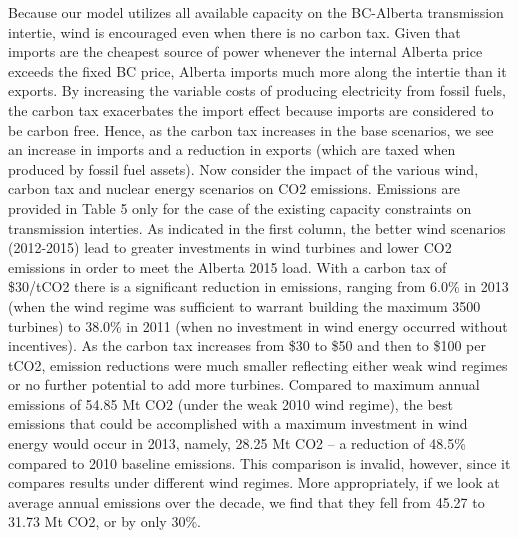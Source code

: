 \begin{table}[]
\end{table}




Because our model utilizes all available capacity on the BC-Alberta transmission intertie, wind is encouraged even when there is no carbon tax. Given that imports are the cheapest source of power whenever the internal Alberta price exceeds the fixed BC price, Alberta imports much more along the intertie than it exports. By increasing the variable costs of producing electricity from fossil fuels, the carbon tax exacerbates the import effect because imports are considered to be carbon free. Hence, as the carbon tax increases in the base scenarios, we see an increase in imports and a reduction in exports (which are taxed when produced by fossil fuel assets).
Now consider the impact of the various wind, carbon tax and nuclear energy scenarios on CO2 emissions. Emissions are provided in Table 5 only for the case of the existing capacity constraints on transmission interties. As indicated in the first column, the better wind scenarios (2012-2015) lead to greater investments in wind turbines and lower CO2 emissions in order to meet the Alberta 2015 load. With a carbon tax of \$30/tCO2 there is a significant reduction in emissions, ranging from 6.0\% in 2013 (when the wind regime was sufficient to warrant building the maximum 3500 turbines) to 38.0\% in 2011 (when no investment in wind energy occurred without incentives). As the carbon tax increases from \$30 to \$50 and then to \$100 per tCO2, emission reductions were much smaller reflecting either weak wind regimes or no further potential to add more turbines. Compared to maximum annual emissions of 54.85 Mt CO2 (under the weak 2010 wind regime), the best emissions that could be accomplished with a maximum investment in wind energy would occur in 2013, namely, 28.25 Mt CO2 – a reduction of 48.5\% compared to 2010 baseline emissions. This comparison is invalid, however, since it compares results under different wind regimes. More appropriately, if we look at average annual emissions over the decade, we find that they fell from 45.27 to 31.73 Mt CO2, or by only 30\%. 



